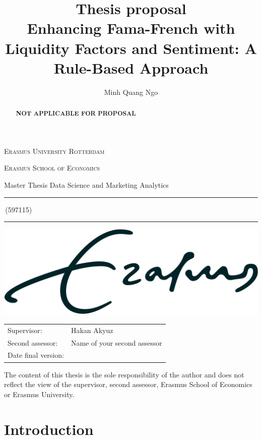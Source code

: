\documentclass[a4paper,11pt]{article}
\author{Minh Quang Ngo}
\title{Thesis proposal \\ Enhancing Fama-French with Liquidity Factors and Sentiment: A Rule-Based Approach}
\newcommand{\studentnumber}{597115}
\newcommand{\program}{Data Science and Marketing Analytics}
\newcommand{\supervisor}{Hakan Akyuz}
\newcommand{\secondassesor}{Name of your second assessor}
\begin{document}
\begin{titlepage}
\makeatletter
\begin{center}
	\textsc{Erasmus University Rotterdam}
	\par \textsc{Erasmus School of Economics}
	\par Master Thesis \program

	\vfill \hrule height .08em \bigskip
	\par\huge\@title\bigskip
	\par\Large\@author\,(\studentnumber)\bigskip
	\hrule height .08em\normalsize
	
	\vfill
	\includegraphics[width=\textwidth,height=0.15\textheight,keepaspectratio]{eur} %
	\vfill
	
	\begin{tabular}{ll}
		\toprule
		Supervisor: & \supervisor\\
		Second assessor: & \secondassesor\\
		Date final version: & \@date\\
		\bottomrule
	\end{tabular}
	
	\vfill
	The content of this thesis is the sole responsibility of the author and does not reflect the view of the supervisor, second assessor, Erasmus School of Economics or Erasmus University.
\end{center}
\makeatother
\end{titlepage}

\begin{abstract}
	\textbf{NOT APPLICABLE FOR PROPOSAL}
\end{abstract}
\newpage

\tableofcontents
\newpage

\section{Introduction}
    
\end{document}
